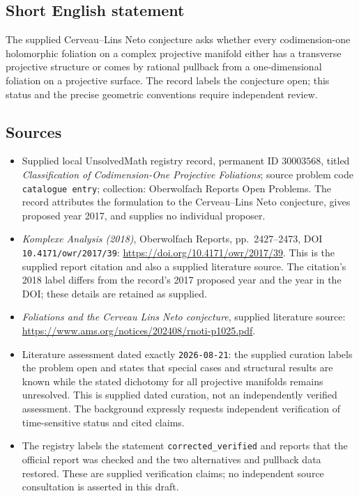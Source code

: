 \documentclass[11pt]{article}
\begin{document}
\subsection{Short English statement}
The supplied Cerveau--Lins Neto conjecture asks whether every codimension-one holomorphic foliation on a complex projective manifold either has a transverse projective structure or comes by rational pullback from a one-dimensional foliation on a projective surface. The record labels the conjecture open; this status and the precise geometric conventions require independent review.
\subsection{Sources}
\begin{itemize}
\item Supplied local UnsolvedMath registry record, permanent ID \(30003568\), titled \emph{Classification of Codimension-One Projective Foliations}; source problem code \texttt{catalogue entry}; collection: Oberwolfach Reports Open Problems. The record attributes the formulation to the Cerveau--Lins Neto conjecture, gives proposed year 2017, and supplies no individual proposer.
\item \emph{Komplexe Analysis (2018)}, Oberwolfach Reports, pp.\ 2427--2473, DOI \texttt{10.4171/owr/2017/39}: \url{https://doi.org/10.4171/owr/2017/39}. This is the supplied report citation and also a supplied literature source. The citation's 2018 label differs from the record's 2017 proposed year and the year in the DOI; these details are retained as supplied.
\item \emph{Foliations and the Cerveau Lins Neto conjecture}, supplied literature source: \url{https://www.ams.org/notices/202408/rnoti-p1025.pdf}.
\item Literature assessment dated exactly \texttt{2026-08-21}: the supplied curation labels the problem open and states that special cases and structural results are known while the stated dichotomy for all projective manifolds remains unresolved. This is supplied dated curation, not an independently verified assessment. The background expressly requests independent verification of time-sensitive status and cited claims.
\item The registry labels the statement \texttt{corrected\_verified} and reports that the official report was checked and the two alternatives and pullback data restored. These are supplied verification claims; no independent source consultation is asserted in this draft.
\end{itemize}
\end{document}
